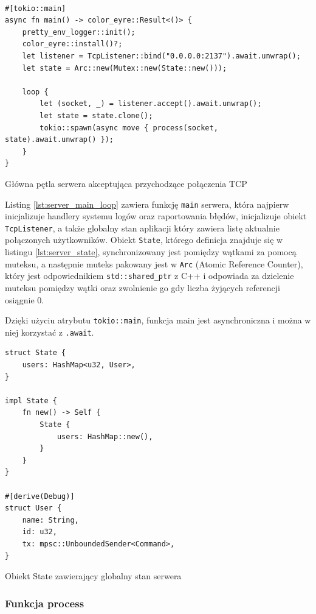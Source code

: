 \begin{listing}[H]
    \begin{verbatim}

#[tokio::main]
async fn main() -> color_eyre::Result<()> {
    pretty_env_logger::init();
    color_eyre::install()?;
    let listener = TcpListener::bind("0.0.0.0:2137").await.unwrap();
    let state = Arc::new(Mutex::new(State::new()));

    loop {
        let (socket, _) = listener.accept().await.unwrap();
        let state = state.clone();
        tokio::spawn(async move { process(socket, state).await.unwrap() });
    }
}
    \end{verbatim}
    \caption{Główna pętla serwera akceptująca przychodzące połączenia TCP}
    \label{lst:server_main_loop}
\end{listing}

Listing \ref{lst:server_main_loop} zawiera funkcję \verb|main| serwera, która najpierw inicjalizuje
handlery systemu logów oraz raportowania błędów, inicjalizuje obiekt \verb|TcpListener|, a
także globalny stan aplikacji który zawiera listę aktualnie połączonych użytkowników. Obiekt
\verb|State|, którego definicja znajduje się w listingu \ref{lst:server_state}, synchronizowany jest
pomiędzy wątkami za pomocą muteksu, a następnie muteks pakowany jest w \verb|Arc| (Atomic Reference
Counter), który jest odpowiednikiem \verb|std::shared_ptr| z C++ i odpowiada za dzielenie muteksu
pomiędzy wątki oraz zwolnienie go gdy liczba żyjących referencji osiągnie 0.

Dzięki użyciu atrybutu \verb|tokio::main|, funkcja main jest asynchroniczna i można w
niej korzystać z \verb|.await|.

\begin{listing}[H]
    \begin{verbatim}
struct State {
    users: HashMap<u32, User>,
}

impl State {
    fn new() -> Self {
        State {
            users: HashMap::new(),
        }
    }
}

#[derive(Debug)]
struct User {
    name: String,
    id: u32,
    tx: mpsc::UnboundedSender<Command>,
}
    \end{verbatim}
    \caption{Obiekt State zawierający globalny stan serwera}
    \label{lst:server_state}
\end{listing}

\subsubsection{Funkcja process}

